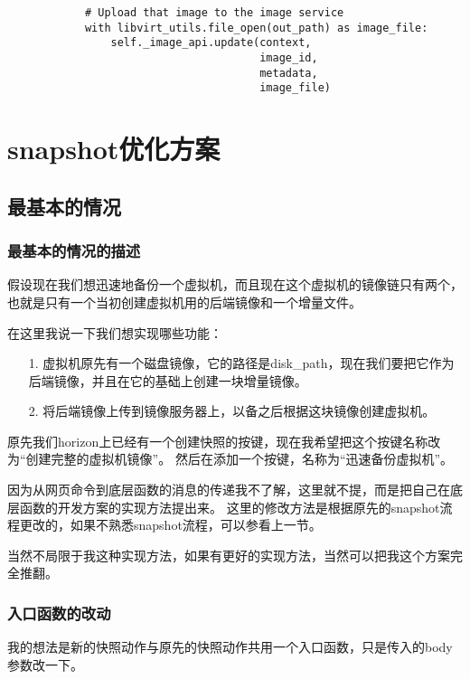 \documentclass[a4paper,left=1.5cm,right=1.5cm,11pt]{article}
\begin{document}
\begin{lstlisting}
            # Upload that image to the image service
            with libvirt_utils.file_open(out_path) as image_file:
                self._image_api.update(context,
                                       image_id,
                                       metadata,
                                       image_file)
    \end{lstlisting}

\clearpage

\section{snapshot优化方案}
\subsection{最基本的情况}
\subsubsection{最基本的情况的描述}
    假设现在我们想迅速地备份一个虚拟机，而且现在这个虚拟机的镜像链只有两个，也就是只有一个当初创建虚拟机用的后端镜像和一个增量文件。\par

    在这里我说一下我们想实现哪些功能：
    \begin{itemize}
        \item[1.] 虚拟机原先有一个磁盘镜像，它的路径是disk\_path，现在我们要把它作为后端镜像，并且在它的基础上创建一块增量镜像。
        \item[2.] 将后端镜像上传到镜像服务器上，以备之后根据这块镜像创建虚拟机。
    \end{itemize}

    原先我们horizon上已经有一个创建快照的按键，现在我希望把这个按键名称改为“创建完整的虚拟机镜像”。
    然后在添加一个按键，名称为“迅速备份虚拟机”。\par

    因为从网页命令到底层函数的消息的传递我不了解，这里就不提，而是把自己在底层函数的开发方案的实现方法提出来。
    这里的修改方法是根据原先的snapshot流程更改的，如果不熟悉snapshot流程，可以参看上一节。\par

    当然不局限于我这种实现方法，如果有更好的实现方法，当然可以把我这个方案完全推翻。

\subsubsection{入口函数的改动}
    我的想法是新的快照动作与原先的快照动作共用一个入口函数，只是传入的body参数改一下。\par
\end{document}

